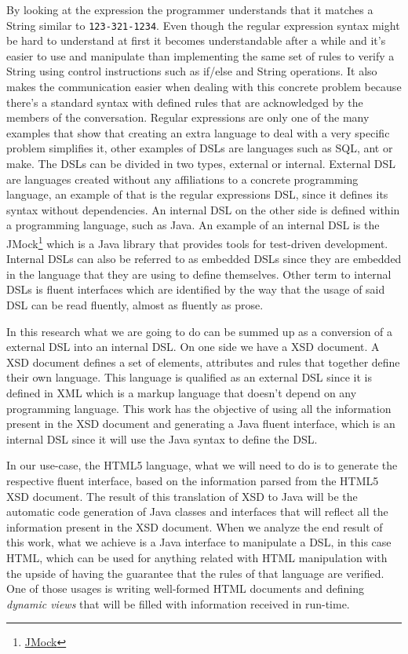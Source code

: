\noindent
By looking at the expression the programmer understands that it matches a String similar to \texttt{123-321-1234}. Even though the regular expression syntax might be hard to understand at first it becomes understandable after a while and it's easier to use and manipulate than implementing the same set of rules to verify a String using control instructions such as if/else and String operations. It also makes the communication easier when dealing with this concrete problem because there's a standard syntax with defined rules that are acknowledged by the members of the conversation. Regular expressions are only one of the many examples that show that creating an extra language to deal with a very specific problem simplifies it, other examples of \ac{DSL}s are languages such as SQL, ant or make. The \ac{DSL}s can be divided in two types, external or internal. External \ac{DSL} are languages created without any affiliations to a concrete programming language, an example of that is the regular expressions \ac{DSL}, since it defines its syntax without dependencies. An internal \ac{DSL} on the other side is defined within a programming language, such as Java. An example of an internal \ac{DSL} is the JMock\footnote{\href{http://jmock.org/}{JMock}} which is a Java library that provides tools for test-driven development. Internal \ac{DSL}s can also be referred to as embedded \ac{DSL}s since they are embedded in the language that they are using to define themselves. Other term to internal \ac{DSL}s is fluent interfaces which are identified by the way that the usage of said \ac{DSL} can be read fluently, almost as fluently as prose.

\noindent
In this research what we are going to do can be summed up as a conversion of a external \ac{DSL} into an internal \ac{DSL}. On one side we have a \ac{XSD} document. A \ac{XSD} document defines a set of elements, attributes and rules that together define their own language. This language is qualified as an external \ac{DSL} since it is defined in \ac{XML} which is a markup language that doesn't depend on any programming language. This work has the objective of using all the information present in the \ac{XSD} document and generating a Java fluent interface, which is an internal \ac{DSL} since it will use the Java syntax to define the \ac{DSL}. 

\noindent
In our use-case, the \ac{HTML}5 language, what we will need to do is to generate the respective fluent interface, based on the information parsed from the \ac{HTML}5 \ac{XSD} document. The result of this translation of \ac{XSD} to Java will be the automatic code generation of Java classes and interfaces that will reflect all the information present in the \ac{XSD} document. When we analyze the end result of this work, what we achieve is a Java interface to manipulate a \ac{DSL}, in this case \ac{HTML}, which can be used for anything related with \ac{HTML} manipulation with the upside of having the guarantee that the rules of that language are verified. One of those usages is writing well-formed \ac{HTML} documents and defining \textit{dynamic views} that will be filled with information received in run-time.

